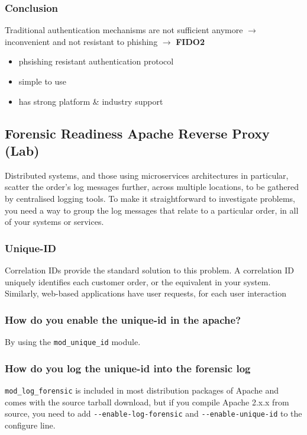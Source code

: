 \subsubsection{Conclusion}
Traditional authentication mechanisms are not sufficient anymore $\rightarrow$ inconvenient and not resistant to phishing $\rightarrow$ \textbf{FIDO2}
\begin{itemize}
    \item phsishing resistant authentication protocol
    \item simple to use
    \item has strong platform \& industry support
\end{itemize}


\subsection{Forensic Readiness Apache Reverse Proxy (Lab)}
Distributed systems, and those using microservices architectures in particular, scatter the order's log messages further, across multiple locations, to be gathered by centralised logging tools. To make it straightforward to investigate problems, you need a way to group the log messages that relate to a particular order, in all of your systems or services.

\subsubsection{Unique-ID}
Correlation IDs provide the standard solution to this problem. A correlation ID uniquely identifies each \glqq customer order\grqq, or the equivalent in your system. Similarly, web-based applications have \glqq user requests\grqq, for each user interaction

\subsubsection{How do you enable the unique-id in the apache?}
By using the \lstinline|mod_unique_id| module.

\subsubsection{How do you log the unique-id into the forensic log}
\lstinline|mod_log_forensic| is included in most distribution packages of Apache and comes with the source tarball download, but if you compile Apache 2.x.x from source, you need to add \lstinline|--enable-log-forensic| and \lstinline|--enable-unique-id| to the configure line.

